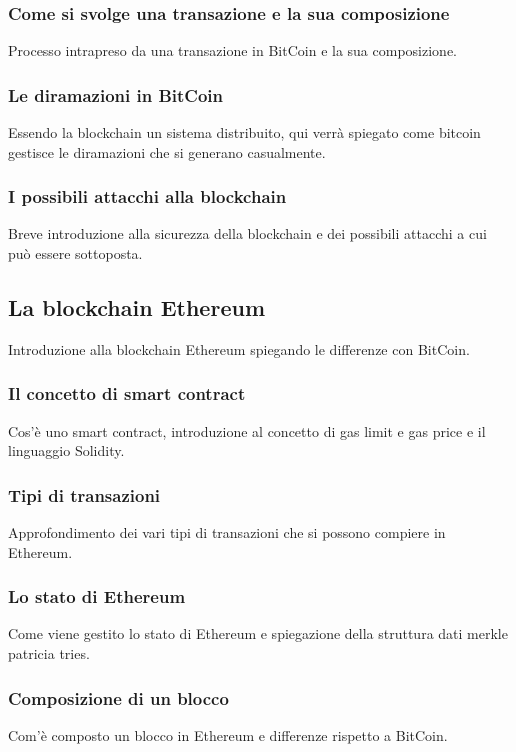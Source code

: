 \subsubsection{Come si svolge una transazione e la sua composizione}
Processo intrapreso da una transazione in BitCoin e la sua composizione.

\subsubsection{Le diramazioni in BitCoin}
Essendo la blockchain un sistema distribuito, qui verrà spiegato come bitcoin gestisce le diramazioni che si generano casualmente.

\subsubsection{I possibili attacchi alla blockchain}
Breve introduzione alla sicurezza della blockchain e dei possibili attacchi a cui può essere sottoposta.

\subsection{La blockchain Ethereum}
Introduzione alla blockchain Ethereum spiegando le differenze con BitCoin.

\subsubsection{Il concetto di smart contract}
Cos'è uno smart contract, introduzione al concetto di gas limit e gas price e il linguaggio Solidity.

\subsubsection{Tipi di transazioni}
Approfondimento dei vari tipi di transazioni che si possono compiere in Ethereum.

\subsubsection{Lo stato di Ethereum}
Come viene gestito lo stato di Ethereum e spiegazione della struttura dati merkle patricia tries.

\subsubsection{Composizione di un blocco}
Com'è composto un blocco in Ethereum e differenze rispetto a BitCoin.

